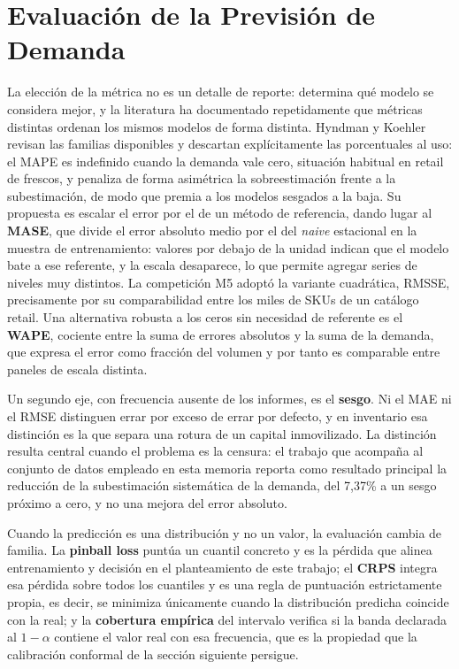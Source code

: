 \section{Evaluación de la Previsión de Demanda}
\label{sec:sota_evaluacion}
La elección de la métrica no es un detalle de reporte: determina qué modelo se considera mejor, y
la literatura ha documentado repetidamente que métricas distintas ordenan los mismos modelos de
forma distinta. Hyndman y Koehler \cite{hyndman2006another} revisan las familias disponibles y
descartan explícitamente las porcentuales al uso: el MAPE es indefinido cuando la demanda vale
cero, situación habitual en retail de frescos, y penaliza de forma asimétrica la sobreestimación
frente a la subestimación, de modo que premia a los modelos sesgados a la baja. Su propuesta es
escalar el error por el de un método de referencia, dando lugar al \textbf{MASE}, que divide el
error absoluto medio por el del \textit{naive} estacional en la muestra de entrenamiento: valores
por debajo de la unidad indican que el modelo bate a ese referente, y la escala desaparece, lo
que permite agregar series de niveles muy distintos. La competición M5 \cite{makridakis2022m5}
adoptó la variante cuadrática, RMSSE, precisamente por su comparabilidad entre los miles de SKUs
de un catálogo retail. Una alternativa robusta a los ceros sin necesidad de referente es el
\textbf{WAPE}, cociente entre la suma de errores absolutos y la suma de la demanda, que expresa
el error como fracción del volumen y por tanto es comparable entre paneles de escala distinta.

Un segundo eje, con frecuencia ausente de los informes, es el \textbf{sesgo}. Ni el MAE ni el
RMSE distinguen errar por exceso de errar por defecto, y en inventario esa distinción es la que
separa una rotura de un capital inmovilizado. La distinción resulta central cuando el problema es
la censura: el trabajo que acompaña al conjunto de datos empleado en esta memoria
\cite{freshretailnet2025} reporta como resultado principal la reducción de la subestimación
sistemática de la demanda, del 7,37\% a un sesgo próximo a cero, y no una mejora del error
absoluto.

Cuando la predicción es una distribución y no un valor, la evaluación cambia de familia. La
\textbf{pinball loss} \cite{koenker2005quantile} puntúa un cuantil concreto y es la pérdida que
alinea entrenamiento y decisión en el planteamiento de este trabajo; el \textbf{CRPS}
\cite{gneiting2007strictly} integra esa pérdida sobre todos los cuantiles y es una regla de
puntuación estrictamente propia, es decir, se minimiza únicamente cuando la distribución
predicha coincide con la real; y la \textbf{cobertura empírica} del intervalo verifica si la
banda declarada al $1-\alpha$ contiene el valor real con esa frecuencia, que es la propiedad
que la calibración conformal de la sección siguiente persigue.

